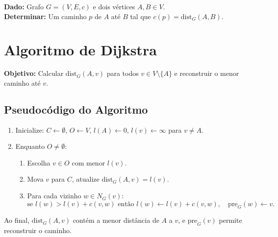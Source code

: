 \documentclass[a4paper,12pt]{article}
\begin{document}
\textbf{Dado:} Grafo \( G = (V, E, c) \) e dois vértices \( A, B \in V \).\\
\textbf{Determinar:} Um caminho \( p \) de \( A \) até \( B \) tal que \( c(p) = \mathrm{dist}_G(A, B) \).

\section{Algoritmo de Dijkstra}

\textbf{Objetivo:} Calcular \( \mathrm{dist}_G(A, v) \) para todos \( v \in V \setminus \{A\} \) e reconstruir o menor caminho até \( v \).

\subsection*{Pseudocódigo do Algoritmo}

\begin{enumerate}[noitemsep]
  \item Inicialize: \( C \leftarrow \emptyset \), \( O \leftarrow V \), \( l(A) \leftarrow 0 \), \( l(v) \leftarrow \infty \) para \( v \neq A \).
  \item Enquanto \( O \neq \emptyset \):
    \begin{enumerate}[noitemsep]
      \item Escolha \( v \in O \) com menor \( l(v) \).
      \item Mova \( v \) para \( C \), atualize \( \mathrm{dist}_G(A, v) = l(v) \).
      \item Para cada vizinho \( w \in N_G(v) \):
      \[
      \text{se } l(w) > l(v) + c(v, w) \text{ então } l(w) \leftarrow l(v) + c(v, w), \quad \text{pre}_G(w) \leftarrow v.
      \]
    \end{enumerate}
\end{enumerate}

Ao final, \( \mathrm{dist}_G(A, v) \) contém a menor distância de \( A \) a \( v \), e \( \text{pre}_G(v) \) permite reconstruir o caminho.
\end{document}
